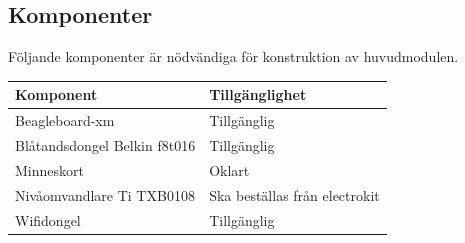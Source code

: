 \subsection{Komponenter}
Följande komponenter är nödvändiga för konstruktion av huvudmodulen.\\
\begin{tabularx}{\textwidth}{| l | X |}
	\hline
	{\textbf{Komponent}} & {\textbf{Tillgänglighet}} \\\hline
	{Beagleboard-xm} & {Tillgänglig} \\\hline
	{Blåtandsdongel Belkin f8t016} & {Tillgänglig} \\\hline
	{Minneskort} & {Oklart} \\\hline
	{Nivåomvandlare Ti TXB0108} & {Ska beställas från electrokit\cite{nivaomvandlare}} \\\hline
	{Wifidongel} & {Tillgänglig} \\\hline
\end{tabularx}
